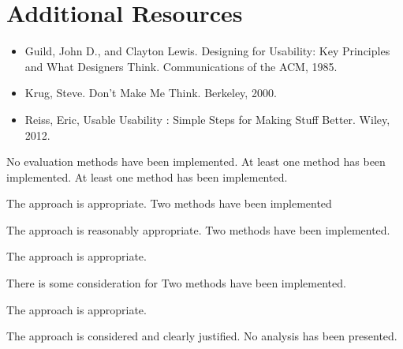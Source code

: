 \documentclass{../fal_assignment}
\begin{document}
\section*{Additional Resources}
\begin{itemize}
    \item Guild, John D., and Clayton Lewis. Designing for Usability: Key Principles and What Designers Think. Communications of the ACM, 1985.
    \item Krug, Steve. Don't Make Me Think. Berkeley, 2000. 
    \item Reiss, Eric, Usable Usability : Simple Steps for Making Stuff Better. Wiley, 2012.
\end{itemize}

\begin{markingrubric}
        \grade\fail 	No evaluation methods have been implemented.
        \grade 		At least one method has been implemented.
        \grade 		At least one method has been implemented.
        \par		The approach is appropriate. 
        \grade 		Two methods have been implemented 
        \par		The approach is reasonably appropriate.
        \grade 		Two methods have been implemented.
        \par		The approach is appropriate.
        \par 		There is some consideration for 
        \grade 		Two methods have been implemented.
        \par		The approach is appropriate.
        \par		The approach is considered and clearly justified.
        \grade\fail 	No analysis has been presented.
        

\end{markingrubric}
\end{document}
